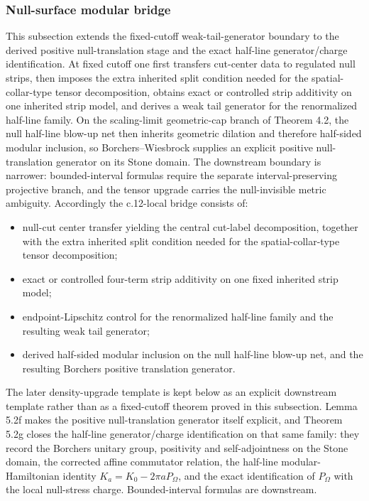 \subsubsection{Null-surface modular bridge}\label{52-null-surface-modular-bridge}

This subsection extends the fixed-cutoff weak-tail-generator boundary to the derived positive null-translation stage and the exact half-line generator/charge identification. At fixed cutoff one first transfers cut-center data to regulated null strips, then imposes the extra inherited split condition needed for the spatial-collar-type tensor decomposition, obtains exact or controlled strip additivity on one inherited strip model, and derives a weak tail generator for the renormalized half-line family. On the scaling-limit geometric-cap branch of Theorem 4.2, the null half-line blow-up net then inherits geometric dilation and therefore half-sided modular inclusion, so Borchers--Wiesbrock supplies an explicit positive null-translation generator on its Stone domain. The downstream boundary is narrower: bounded-interval formulas require the separate interval-preserving projective branch, and the tensor upgrade carries the null-invisible metric ambiguity. Accordingly the c.12-local bridge consists of:
\begin{itemize}
\tightlist
\item
  null-cut center transfer yielding the central cut-label decomposition, together with the extra inherited split condition needed for the spatial-collar-type tensor decomposition;
\item
  exact or controlled four-term strip additivity on one fixed inherited strip model;
\item
  endpoint-Lipschitz control for the renormalized half-line family and the resulting weak tail generator;
\item
  derived half-sided modular inclusion on the null half-line blow-up net, and the resulting Borchers positive translation generator.
\end{itemize}
The later density-upgrade template is kept below as an explicit downstream template rather than as a fixed-cutoff theorem proved in this subsection. Lemma 5.2f makes the positive null-translation generator itself explicit, and Theorem 5.2g closes the half-line generator/charge identification on that same family: they record the Borchers unitary group, positivity and self-adjointness on the Stone domain, the corrected affine commutator relation, the half-line modular-Hamiltonian identity \(K_a=K_0-2\pi aP_\Omega\), and the exact identification of \(P_\Omega\) with the local null-stress charge. Bounded-interval formulas are downstream.

